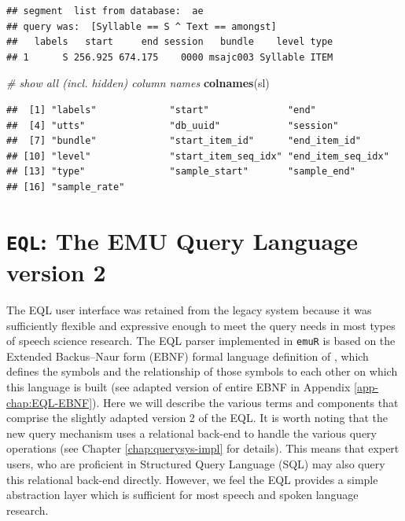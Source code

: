 \documentclass[]{book}
\newenvironment{Shaded}{\begin{snugshade}}{\end{snugshade}}
\newcommand{\CommentTok}[1]{\textcolor[rgb]{0.56,0.35,0.01}{\textit{#1}}}
\newcommand{\KeywordTok}[1]{\textcolor[rgb]{0.13,0.29,0.53}{\textbf{#1}}}
\newcommand{\NormalTok}[1]{#1}
\begin{document}
\begin{verbatim}
## segment  list from database:  ae 
## query was:  [Syllable == S ^ Text == amongst] 
##   labels   start     end session   bundle    level type
## 1      S 256.925 674.175    0000 msajc003 Syllable ITEM
\end{verbatim}

\begin{Shaded}
\begin{Highlighting}[]
\CommentTok{# show all (incl. hidden) column names}
\KeywordTok{colnames}\NormalTok{(sl)}
\end{Highlighting}
\end{Shaded}

\begin{verbatim}
##  [1] "labels"             "start"              "end"               
##  [4] "utts"               "db_uuid"            "session"           
##  [7] "bundle"             "start_item_id"      "end_item_id"       
## [10] "level"              "start_item_seq_idx" "end_item_seq_idx"  
## [13] "type"               "sample_start"       "sample_end"        
## [16] "sample_rate"
\end{verbatim}

\hypertarget{eql-the-emu-query-language-version-2}{%
\section{\texorpdfstring{\texttt{EQL}: The EMU Query Language version 2}{EQL: The EMU Query Language version 2}}\label{eql-the-emu-query-language-version-2}}

The EQL user interface was retained from the legacy system because it was sufficiently flexible and expressive enough to meet the query needs in most types of speech science research. The EQL parser implemented in \texttt{emuR} is based on the Extended Backus--Naur form (EBNF) \citep{garshol:2003a} formal language definition of \citet{john:2012a}, which defines the symbols and the relationship of those symbols to each other on which this language is built (see adapted version of entire EBNF in Appendix \ref{app-chap:EQL-EBNF}). Here we will describe the various terms and components that comprise the slightly adapted version 2 of the EQL. It is worth noting that the new query mechanism uses a relational back-end to handle the various query operations (see Chapter \ref{chap:querysys-impl} for details). This means that expert users, who are proficient in Structured Query Language (SQL) may also query this relational back-end directly. However, we feel the EQL provides a simple abstraction layer which is sufficient for most speech and spoken language research.
\end{document}
